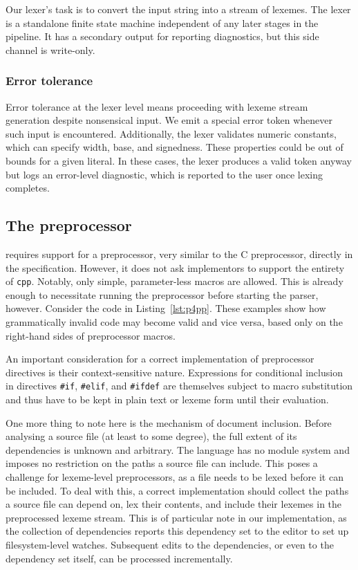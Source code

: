 Our lexer's task is to convert the input string into a stream of lexemes. The
lexer is a standalone finite state machine independent of any later stages in
the pipeline. It has a secondary output for reporting diagnostics, but this side
channel is write-only.

\subsubsection*{Error tolerance}

Error tolerance at the lexer level means proceeding with lexeme stream
generation despite nonsensical input. We emit a special error token whenever
such input is encountered. Additionally, the lexer validates numeric constants,
which can specify width, base, and signedness. These
properties could be out of bounds for a given literal. In these cases, the lexer
produces a valid token anyway but logs an error-level diagnostic, which is
reported to the user once lexing completes.


\subsection{The preprocessor}

\pfs requires support for a preprocessor, very similar to the C preprocessor,
directly in the specification. However, it does not ask implementors to support
the entirety of \texttt{cpp}. Notably, only simple, parameter-less macros are
allowed. This is already enough to necessitate running the preprocessor before
starting the parser, however. Consider the code in
Listing~\ref{lst:p4pp}. These examples show how
grammatically invalid code may become valid and vice versa, based only on the
right-hand sides of preprocessor macros.

An important consideration for a correct implementation of preprocessor
directives is their context-sensitive nature. Expressions for conditional
inclusion in directives \texttt{\#if}, \texttt{\#elif}, and \texttt{\#ifdef} are
themselves subject to macro substitution and thus have to be kept in plain text
or lexeme form until their evaluation.

One more thing to note here is the mechanism of document inclusion. Before
analysing a \pfs source file (at least to some degree), the full extent of its
dependencies is unknown and arbitrary. The language has no module system and
imposes no restriction on the paths a source file can include. This poses a
challenge for lexeme-level preprocessors, as a file needs to be lexed before it
can be included. To deal with this, a correct implementation should collect the
paths a source file can depend on, lex their contents, and include their lexemes
in the preprocessed lexeme stream. This is of particular note in our
implementation, as the collection of dependencies reports this dependency set to
the editor to set up filesystem-level watches. Subsequent edits to the
dependencies, or even to the dependency set itself, can be processed
incrementally.

